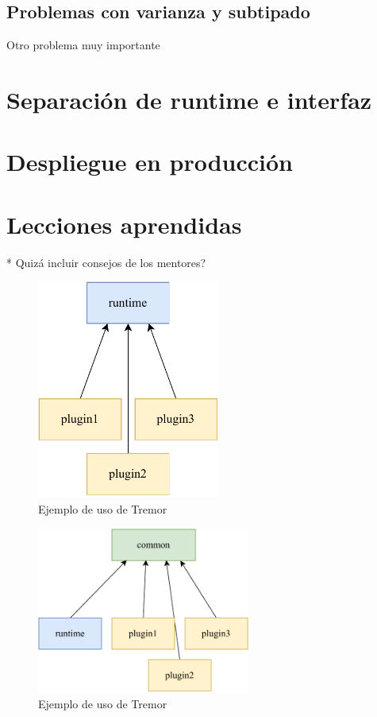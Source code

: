 \subsection{Problemas con varianza y subtipado}

Otro problema muy importante 

\section{Separación de runtime e interfaz}

\section{Despliegue en producción}

\section{Lecciones aprendidas}

* Quizá incluir consejos de los mentores?

\begin{figure}
    \centering
    \includegraphics[width=6cm]{./Imagenes/separation-temporary.pdf}
    \caption{Ejemplo de uso de Tremor}%
    \label{fig:separation_temporary}
\end{figure}

\begin{figure}
    \centering
    \includegraphics[width=7cm]{./Imagenes/separation.pdf}
    \caption{Ejemplo de uso de Tremor}%
    \label{fig:separation}
\end{figure}

